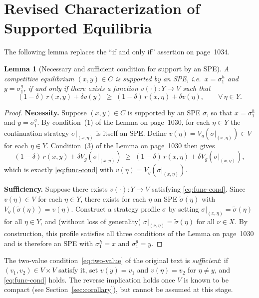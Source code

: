 \documentclass[12pt]{article}
\newtheorem{lemma}[theorem]{Lemma}
\theoremstyle{definition}
\begin{document}
\section{Revised Characterization of Supported Equilibria}
\label{sec:lemma}

The following lemma replaces the ``if and only if'' assertion on page~1034.

\begin{lemma}[Necessary and sufficient condition for support by an SPE]
\label{lem:nsc}
A competitive equilibrium $(x, y) \in C$ is supported by an SPE, i.e.\
$x = \sigma^h_1$ and $y = \sigma^g_1$, if and only if there exists a function
$v(\cdot) : Y \to V$ such that
\begin{equation}
(1-\delta)\,r(x,y) + \delta v(y)
\;\geq\;
(1-\delta)\,r(x,\eta) + \delta v(\eta),
\qquad \forall\, \eta \in Y.
\label{eq:func-cond}
\end{equation}
\end{lemma}

\begin{proof}
\textbf{Necessity.}
Suppose $(x, y) \in C$ is supported by an SPE $\sigma$, so that
$x = \sigma^h_1$ and $y = \sigma^g_1$.
By condition~(1) of the Lemma on page~1030, for each $\eta \in Y$ the
continuation strategy $\sigma|_{(x,\eta)}$ is itself an SPE.
Define $v(\eta) = V_g(\sigma|_{(x,\eta)}) \in V$ for each $\eta \in Y$.
Condition~(3) of the Lemma on page~1030 then gives
\[
(1-\delta)\,r(x,y) + \delta V_g(\sigma|_{(x,y)})
\;\geq\;
(1-\delta)\,r(x,\eta) + \delta V_g(\sigma|_{(x,\eta)}),
\]
which is exactly \eqref{eq:func-cond} with $v(\eta) = V_g(\sigma|_{(x,\eta)})$.

\textbf{Sufficiency.}
Suppose there exists $v(\cdot) : Y \to V$ satisfying \eqref{eq:func-cond}.
Since $v(\eta) \in V$ for each $\eta \in Y$, there exists for each $\eta$ an
SPE $\tilde\sigma(\eta)$ with $V_g(\tilde\sigma(\eta)) = v(\eta)$.
Construct a strategy profile $\sigma$ by setting
$\sigma|_{(x,\eta)} = \tilde\sigma(\eta)$ for all $\eta \in Y$, and
(without loss of generality) $\sigma|_{(\nu,\eta)} = \tilde\sigma(\eta)$
for all $\nu \in X$.
By construction, this profile satisfies all three conditions of the Lemma on
page~1030 and is therefore an SPE with $\sigma^h_1 = x$ and $\sigma^g_1 = y$.
\end{proof}

\bigskip

The two-value condition~\eqref{eq:two-value} of the original text is
\emph{sufficient}: if $(v_1, v_2) \in V \times V$ satisfy it, set $v(y) = v_1$
and $v(\eta) = v_2$ for $\eta \neq y$, and \eqref{eq:func-cond} holds.
The reverse implication holds once $V$ is known to be compact
(see Section~\ref{sec:corollary}), but cannot be assumed at this stage.
\end{document}
